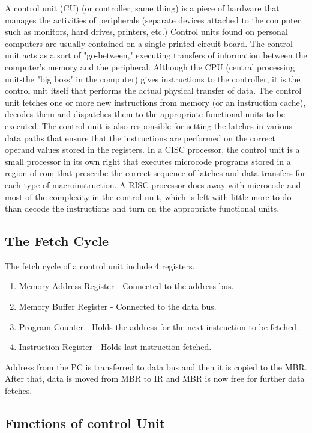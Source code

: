 \documentclass{article}
\begin{document}
 A control unit (CU) (or controller, same thing) is a piece of hardware that manages the activities of peripherals (separate devices attached to the computer, such as monitors, hard drives, printers, etc.) Control units found on personal computers are usually contained on a single printed circuit board. The control unit acts as a sort of "go-between," executing transfers of information between the computer's memory and the peripheral. Although the CPU (central processing unit-the "big boss" in the computer) gives instructions to the controller, it is the control unit itself that performs the actual physical transfer of data.
 The control unit fetches one or more new instructions from memory (or an instruction cache), decodes them and dispatches them to the appropriate functional units to be executed. The control unit is also responsible for setting the latches in various data paths that ensure that the instructions are performed on the correct operand values stored in the registers.
 In a CISC processor, the control unit is a small processor in its own right that executes microcode programs stored in a region of rom that prescribe the correct sequence of latches and data transfers for each type of macroinstruction. A RISC processor does away with microcode and most of the complexity in the control unit, which is left with little more to do than decode the instructions and turn on the appropriate functional units.

\subsection{The Fetch Cycle}
The fetch cycle of a control unit include 4 registers.
\begin{enumerate}
\item Memory Address Register - Connected to the address bus.
\item Memory Buffer Register - Connected to the data bus.
\item Program Counter - Holds the address for the next instruction to be fetched.
\item Instruction Register - Holds last instruction fetched.
\end{enumerate}
Address from the PC is transferred to data bus and then it is copied to the MBR. After that, data is moved from MBR to IR and MBR is now free for further data fetches.

\subsection{Functions of control Unit}
\end{document}
